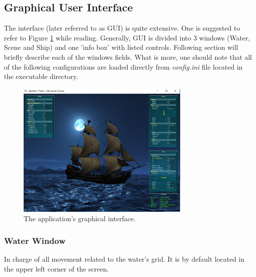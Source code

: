 \documentclass{report}
\begin{document}
\subsection{Graphical User Interface} \label{sub:gui_doc}
The interface (later referred to as GUI) is quite extensive. One is suggested to refer to Figure \ref{fig:gui_example} while reading. Generally, GUI is divided into 3 windows (Water, Scene and Ship) and one 'info box' with listed controls. Following section will briefly describe each of the windows fields. What is more, one should note that all of the following configurations are loaded directly from \textit{config.ini} file located in the executable directory.

\begin{figure}[H] 
    \centering
    \includegraphics[width=0.75\textwidth]{images/gui_example.png}
    \caption{The application's graphical interface.}
    \label{fig:gui_example}
\end{figure}

\subsubsection{Water Window}
In charge of all movement related to the water's grid. It is by default located in the upper left corner of the screen.
\end{document}
